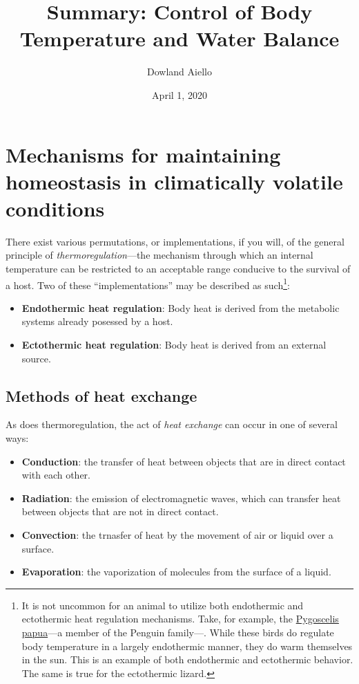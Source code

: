 \documentclass{article}
\begin{document}
\title{Summary: Control of Body Temperature and Water Balance}
\author{Dowland Aiello}
\date{April 1, 2020}

\maketitle
\tableofcontents
\fancyhf{}

\newpage

\section{Mechanisms for maintaining homeostasis in climatically volatile conditions}

There exist various permutations, or implementations, if you will, of the
general principle of \emph{thermoregulation}---the mechanism through which an
internal temperature can be restricted to an acceptable range conducive to the
survival of a host. Two of these ``implementations'' may be described as
such\footnote{It is not uncommon for an animal to utilize both endothermic and
ectothermic heat regulation mechanisms. Take, for example, the
\href{https://en.wikipedia.org/wiki/Gentoo_penguin}{Pygoscelis papua}---a
member of the Penguin family---. While these birds do regulate body temperature
in a largely endothermic manner, they do warm themselves in the sun. This is an
example of both endothermic and ectothermic behavior. The same is true for the
ectothermic lizard.}:

\begin{itemize}
	\item \textbf{Endothermic heat regulation}: Body heat is derived from the metabolic systems already posessed by a host.
	\item \textbf{Ectothermic heat regulation}: Body heat is derived from an external source.
\end{itemize}

\subsection{Methods of heat exchange}

As does thermoregulation, the act of \emph{heat exchange} can occur in one of
several ways:

\begin{itemize}
	\item \textbf{Conduction}: the transfer of heat between objects that are in
		direct contact with each other.
	\item \textbf{Radiation}: the emission of electromagnetic waves, which can
		transfer heat between objects that are not in direct contact.
	\item \textbf{Convection}: the trnasfer of heat by the movement of air or
		liquid over a surface.
	\item \textbf{Evaporation}: the vaporization of molecules from the surface of a liquid.
\end{itemize}
\end{document}
